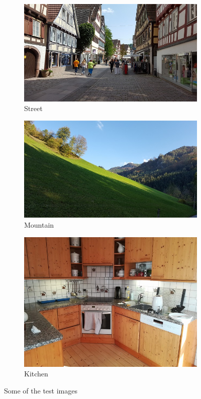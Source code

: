 \begin{figure}[h!]
	\centering
	\begin{subfigure}{0.32\textwidth}
		\includegraphics[width=\textwidth]{figures/own_street} 
		\caption{Street}
	\end{subfigure}
	\begin{subfigure}{0.32\textwidth}
		\includegraphics[width=\textwidth]{figures/own_mountain} 
		\caption{Mountain}
	\end{subfigure}
	\begin{subfigure}{0.32\textwidth}
		\includegraphics[width=\textwidth]{figures/own_kitchen} 
		\caption{Kitchen}
	\end{subfigure}
	\caption{Some of the test images}
	\label{fig:own_images}
\end{figure}